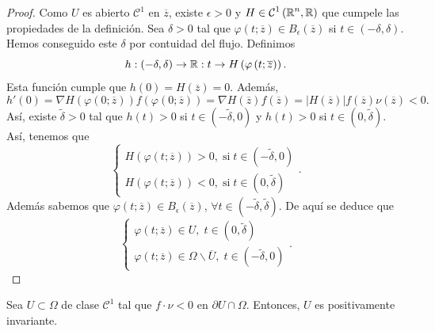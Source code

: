 \begin{proof}
Como $\displaystyle U $ es abierto $\displaystyle \mathcal{C}^{1} $ en $\displaystyle \overline{z} $, existe $\displaystyle \epsilon > 0 $ y $\displaystyle H \in\mathcal{C}^{1}\left(\mathbb{R}^{n}, \mathbb{R}\right) $ que cumpele las propiedades de la definición. Sea $\displaystyle \delta > 0 $ tal que $\displaystyle \varphi\left(t; \overline{z}\right)\in B_{\epsilon }\left(\overline{z}\right) $ si $\displaystyle t \in \left(- \delta, \delta \right) $. 
Hemos conseguido este $\displaystyle \delta  $ por contuidad del flujo. Definimos
\[ h : \left(-\delta, \delta \right)\to \mathbb{R} : t \to H\left(\varphi\left(t; \overline{z}\right)\right) .\]
Esta función cumple que $\displaystyle h\left(0\right)=H\left(\overline{z}\right)=0 $. Además, 
\[h'\left(0\right)=\nabla H\left(\varphi\left(0; \overline{z}\right)\right)f\left(\varphi\left(0; \overline{z}\right)\right)=\nabla H\left(\overline{z}\right)f\left(\overline{z}\right) = \left|H\left(\overline{z}\right)\right|f\left(\overline{z}\right)\nu\left(\overline{z}\right) < 0 .\]
Así, existe $\displaystyle \tilde{\delta} > 0 $ tal que $\displaystyle h\left(t\right) > 0 $ si $\displaystyle t \in \left(-\tilde{\delta }, 0\right) $ y $\displaystyle h\left(t\right) > 0 $ si $\displaystyle t \in \left(0, \tilde{\delta}\right) $. 
Así, tenemos que 
\[
\begin{cases}
	H\left(\varphi\left(t; \overline{z}\right)\right) > 0, \; \text{si} \; t \in \left(- \tilde{\delta}, 0\right) \\
	H\left(\varphi\left(t; \overline{z}\right)\right) < 0, \; \text{si} \; t \in \left(0, \tilde{\delta}\right)
\end{cases}
.\]
Además sabemos que $\displaystyle \varphi\left(t; \overline{z}\right)\in B_{\epsilon }\left(\overline{z}\right) $, $\displaystyle \forall t \in \left(-\tilde{\delta}, \tilde{\delta}\right) $. De aquí se deduce que 
\[
\begin{cases}
	\varphi\left(t; \overline{z}\right)\in U, \; t \in \left(0, \tilde{\delta}\right) \\
	\varphi\left(t; \overline{z}\right)\in \Omega \backslash \overline{U}, \; t \in \left(-\tilde{\delta}, 0\right)
\end{cases}
.\]
\end{proof}
\begin{colorary}
Sea $\displaystyle U\subset \Omega  $ de clase $\displaystyle \mathcal{C}^{1} $ tal que $\displaystyle f \cdot \nu < 0 $ en $\displaystyle \partial U \cap \Omega  $. Entonces, $\displaystyle U $ es positivamente invariante. 
\end{colorary}
